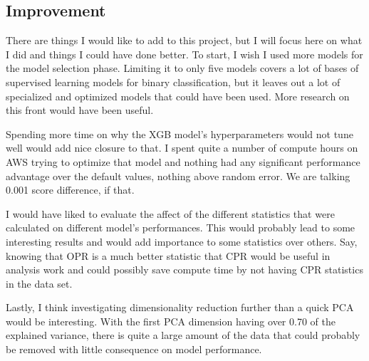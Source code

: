 \documentclass{article}
\begin{document}
\subsection{Improvement}
\par
There are things I would like to add to this project, but I will focus here on what I did and things I could have done better. To start, I wish I used more models for the model selection phase. Limiting it to only five models covers a lot of bases of supervised learning models for binary classification, but it leaves out a lot of specialized and optimized models that could have been used. More research on this front would have been useful.

\par
Spending more time on why the XGB model's hyperparameters would not tune well would add nice closure to that. I spent quite a number of compute hours on AWS trying to optimize that model and nothing had any significant performance advantage over the default values, nothing above random error. We are talking 0.001 score difference, if that.

\par
I would have liked to evaluate the affect of the different statistics that were calculated on different model's performances. This would probably lead to some interesting results and would add importance to some statistics over others. Say, knowing that OPR is a much better statistic that CPR would be useful in analysis work and could possibly save compute time by not having CPR statistics in the data set.

\par
Lastly, I think investigating dimensionality reduction further than a quick PCA would be interesting. With the first PCA dimension having over 0.70 of the explained variance, there is quite a large amount of the data that could probably be removed with little consequence on model performance.

\clearpage


\end{document}
